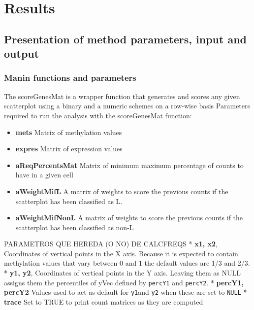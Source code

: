 \documentclass[10pt,letterpaper]{article}
\providecommand{\tightlist}{%
  \setlength{\itemsep}{0pt}\setlength{\parskip}{0pt}}
\begin{document}
\hypertarget{results}{%
\section{Results}\label{results}}

\hypertarget{presentation-of-method-parameters-input-and-output}{%
\subsection{Presentation of method parameters, input and
output}\label{presentation-of-method-parameters-input-and-output}}

\hypertarget{manin-functions-and-parameters}{%
\subsubsection{Manin functions and
parameters}\label{manin-functions-and-parameters}}

The scoreGenesMat is a wrapper function that generates and scores any
given scatterplot using a binary and a numeric schemes on a row-wise
basis Parameters required to run the analysis with the scoreGenesMat
function:

\begin{itemize}
\tightlist
\item
  \textbf{mets} Matrix of methylation values
\item
  \textbf{expres} Matrix of expression values
\item
  \textbf{aReqPercentsMat} Matrix of minimum maximum percentage of
  counts to have in a given cell
\item
  \textbf{aWeightMifL} A matrix of weights to score the previous counts
  if the scatterplot has been classified as L.
\item
  \textbf{aWeightMifNonL} A matrix of weights to score the previous
  counts if the scatterplot has been classified as non-L
\end{itemize}

PARAMETROS QUE HEREDA (O NO) DE CALCFREQS * \textbf{x1, x2}, Coordinates
of vertical points in the X axis. Because it is expected to contain
methylation values that vary between 0 and 1 the default values are 1/3
and 2/3. * \textbf{y1, y2}, Coordinates of vertical points in the Y
axis. Leaving them as NULL assigns them the percentiles of yVec defined
by \texttt{percY1} and \texttt{percY2}. * \textbf{percY1, percY2} Values
used to act as default for \texttt{y1}and \texttt{y2} when these are set
to \texttt{NULL} * \textbf{trace} Set to TRUE to print count matrices as
they are computed
\end{document}
